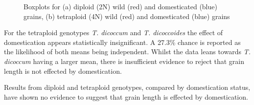 \documentclass[11pt]{report}
\begin{document}
\begin{figure}[!ht]
  \hfill
  \caption{Boxplots for (a) diploid (2N) wild (red) and domesticated (blue) grains, (b) tetraploid (4N) wild (red) and domesticated (blue) grains}
  \label{fig:lendemest}
\end{figure}

For the tetraploid genotypes \emph{T. dicoccum} and \emph{T. dicoccoides} the effect of domestication appears statistically insignificant. A 27.3\% chance is reported as the likelihood of both means being independent. Whilst the data leans towards \emph{T. dicoccum} having a larger mean, there is insufficient evidence to reject that grain length is not effected by domestication.

Results from diploid and tetraploid genotypes, compared by domestication status, have shown no evidence to suggest that grain length is effected by domestication.
\end{document}
